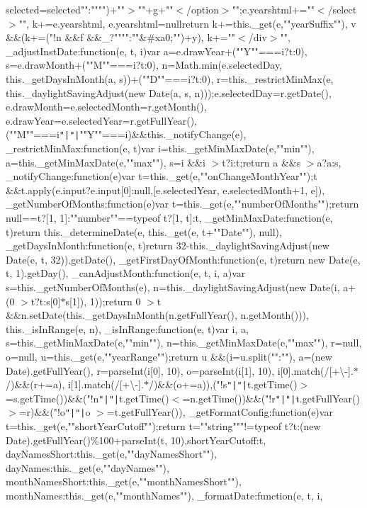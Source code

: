 selected=\textquotesingle{}selected\textquotesingle{}""\+:"""")+""$>$""+g+""$<$/option$>$"";e.\+yearshtml+=""$<$/select$>$"", k+=e.\+yearshtml, e.\+yearshtml=null\rcurly{}return k+=this.\+\_\+get(e,""year\+Suffix""), v \&\&(k+=("!n \&\&f \&\&\+\_\+?""""\+:""\&\#xa0;"")+y), k+=""$<$/div$>$""\rcurly{}, \+\_\+adjust\+Inst\+Date\+:function(e, t, i)\lcurly{}var a=e.\+draw\+Year+(""Y""===i?t\+:0), s=e.\+draw\+Month+(""M""===i?t\+:0), n=\+Math.\+min(e.\+selected\+Day, this.\+\_\+get\+Days\+In\+Month(a, s))+(""D""===i?t\+:0), r=this.\+\_\+restrict\+Min\+Max(e, this.\+\_\+daylight\+Saving\+Adjust(new Date(a, s, n)));e.\+selected\+Day=r.\+get\+Date(), e.\+draw\+Month=e.\+selected\+Month=r.\+get\+Month(), e.\+draw\+Year=e.\+selected\+Year=r.\+get\+Full\+Year(),(""M""===i\texttt{"|}\texttt{"|}""Y""===i)\&\&this.\+\_\+notify\+Change(e)\rcurly{}, \+\_\+restrict\+Min\+Max\+:function(e, t)\lcurly{}var i=this.\+\_\+get\+Min\+Max\+Date(e,""min""), a=this.\+\_\+get\+Min\+Max\+Date(e,""max""), s=i \&\&i $>$t?i\+:t;return a \&\&s $>$a?a\+:s\rcurly{}, \+\_\+notify\+Change\+:function(e)\lcurly{}var t=this.\+\_\+get(e,""on\+Change\+Month\+Year"");t \&\&t.\+apply(e.\+input?e.\+input[0]\+:null,[e.\+selected\+Year, e.\+selected\+Month+1, e])\rcurly{}, \+\_\+get\+Number\+Of\+Months\+:function(e)\lcurly{}var t=this.\+\_\+get(e,""number\+Of\+Months"");return null==t?[1, 1]\+:""number""==typeof t?[1, t]\+:t\rcurly{}, \+\_\+get\+Min\+Max\+Date\+:function(e, t)\lcurly{}return this.\+\_\+determine\+Date(e, this.\+\_\+get(e, t+""Date""), null)\rcurly{}, \+\_\+get\+Days\+In\+Month\+:function(e, t)\lcurly{}return 32-\/this.\+\_\+daylight\+Saving\+Adjust(new Date(e, t, 32)).\+get\+Date()\rcurly{}, \+\_\+get\+First\+Day\+Of\+Month\+:function(e, t)\lcurly{}return new Date(e, t, 1).\+get\+Day()\rcurly{}, \+\_\+can\+Adjust\+Month\+:function(e, t, i, a)\lcurly{}var s=this.\+\_\+get\+Number\+Of\+Months(e), n=this.\+\_\+daylight\+Saving\+Adjust(new Date(i, a+(0 $>$t?t\+:s[0]$\ast$s[1]), 1));return 0 $>$t \&\&n.\+set\+Date(this.\+\_\+get\+Days\+In\+Month(n.\+get\+Full\+Year(), n.\+get\+Month())), this.\+\_\+is\+In\+Range(e, n)\rcurly{}, \+\_\+is\+In\+Range\+:function(e, t)\lcurly{}var i, a, s=this.\+\_\+get\+Min\+Max\+Date(e,""min""), n=this.\+\_\+get\+Min\+Max\+Date(e,""max""), r=null, o=null, u=this.\+\_\+get(e,""year\+Range"");return u \&\&(i=u.\+split(""\+:""), a=(new Date).\+get\+Full\+Year(), r=parse\+Int(i[0], 10), o=parse\+Int(i[1], 10), i[0].\+match(/[+\textbackslash{}-\/].$\ast$/)\&\&(r+=a), i[1].\+match(/[+\textbackslash{}-\/].$\ast$/)\&\&(o+=a)),("!s\texttt{"|}\texttt{"|}t.\+get\+Time()$>$=s.\+get\+Time())\&\&("!n\texttt{"|}\texttt{"|}t.\+get\+Time()$<$=n.\+get\+Time())\&\&("!r\texttt{"|}\texttt{"|}t.\+get\+Full\+Year()$>$=r)\&\&("!o\texttt{"|}\texttt{"|}o $>$=t.\+get\+Full\+Year())\rcurly{}, \+\_\+get\+Format\+Config\+:function(e)\lcurly{}var t=this.\+\_\+get(e,""short\+Year\+Cutoff"");return t=""string"""!=typeof t?t\+:(new Date).\+get\+Full\+Year()\%100+parse\+Int(t, 10),\lcurly{}short\+Year\+Cutoff\+:t, day\+Names\+Short\+:this.\+\_\+get(e,""day\+Names\+Short""), day\+Names\+:this.\+\_\+get(e,""day\+Names""), month\+Names\+Short\+:this.\+\_\+get(e,""month\+Names\+Short""), month\+Names\+:this.\+\_\+get(e,""month\+Names"")\rcurly{}\rcurly{}, \+\_\+format\+Date\+:function(e, t, i, 